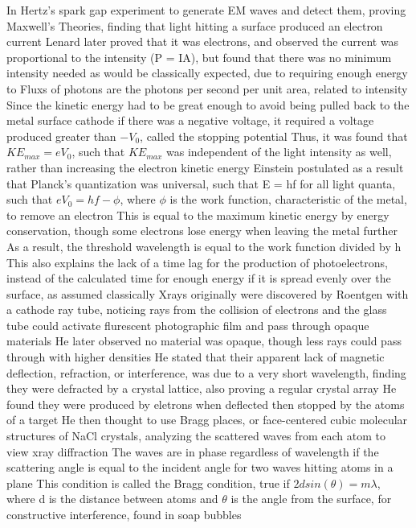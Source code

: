 \documentclass[11 pt, twoside]{article}
\newenvironment{outline*}
{
	\begin{outline}[enumerate]
	}
	{\end{outline}
}
\begin{document}
\begin{outline*}
\1 In Hertz's spark gap experiment to generate EM waves and detect them, proving Maxwell's Theories, finding that light hitting a surface produced an electron current
	\2 Lenard later proved that it was electrons, and observed the current was proportional to the intensity (P = IA), but found that there was no minimum intensity needed as would be classically expected, due to requiring enough energy to
		\3 Fluxs of photons are the photons per second per unit area, related to intensity 
		\3 Since the kinetic energy had to be great enough to avoid being pulled back to the metal surface cathode if there was a negative voltage, it required a voltage produced greater than $-V_0$, called the stopping potential
		\3 Thus, it was found that $KE_{max} = eV_0$, such that $KE_{max}$ was independent of the light intensity as well, rather than increasing the electron kinetic energy
	\2 Einstein postulated as a result that Planck's quantization was universal, such that E = hf for all light quanta, such that $eV_0 = hf - \phi$, where $\phi$ is the work function, characteristic of the metal, to remove an electron
		\3 This is equal to the maximum kinetic energy by energy conservation, though some electrons lose energy when leaving the metal further
		\3 As a result, the threshold wavelength is equal to the work function divided by h
		\3 This also explains the lack of a time lag for the production of photoelectrons, instead of the calculated time for enough energy if it is spread evenly over the surface, as assumed classically
\1 Xrays originally were discovered by Roentgen with a cathode ray tube, noticing rays from the collision of electrons and the glass tube could activate flurescent photographic film and pass through opaque materials
	\2 He later observed no material was opaque, though less rays could pass through with higher densities
	\2 He stated that their apparent lack of magnetic deflection, refraction, or interference, was due to a very short wavelength, finding they were defracted by a crystal lattice, also proving a regular crystal array
	\2 He found they were produced by eletrons when deflected then stopped by the atoms of a target
	\2 He then thought to use Bragg places, or face-centered cubic molecular structures of NaCl crystals, analyzing the scattered waves from each atom to view xray diffraction
		\3 The waves are in phase regardless of wavelength if the scattering angle is equal to the incident angle for two waves hitting atoms in a plane
		\3 This condition is called the Bragg condition, true if $2dsin(\theta) = m\lambda$, where d is the distance between atoms and $\theta$ is the angle from the surface, for constructive interference, found in soap bubbles

\end{outline*}
\end{document}
